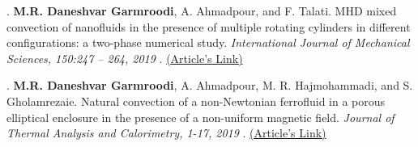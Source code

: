 \documentclass[10.5pt]{article}
\begin{document}
		. {\textbf{M.R. Daneshvar Garmroodi}, A. Ahmadpour, and F. Talati. MHD mixed convection
			of nanofluids in the presence of multiple rotating cylinders in different configurations:
			a two-phase numerical study.\textit{ International Journal of Mechanical Sciences, 150:247
				– 264, 2019} . \href{https://www.sciencedirect.com/science/article/pii/S0020740318309251?via3Dihub}{({Article's Link})}}
			
		. {\textbf{M.R. Daneshvar Garmroodi}, A. Ahmadpour, M. R. Hajmohammadi, and S. Gholamrezaie. Natural convection of a non-Newtonian ferrofluid in a porous elliptical enclosure in the presence of a non-uniform magnetic field.\textit{ Journal of Thermal Analysis and Calorimetry, 1-17, 2019} . \href{https://link.springer.com/article/10.1007/s10973-019-09045-3}{({Article's Link})}}


		
	
	
\end{document}
